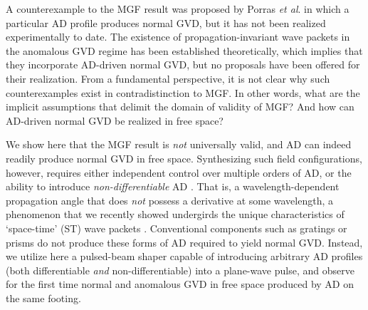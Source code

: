 \documentclass[reprint,
 amsmath,amssymb,
 aps,
]{revtex4-2}
\begin{document}
A counterexample to the MGF result was proposed by Porras \textit{et al}. \cite{Porras03PRE2} in which a particular AD profile produces normal GVD, but it has not been realized experimentally to date. The existence of propagation-invariant wave packets in the anomalous GVD regime \cite{Zamboni03OC,Longhi03PRE,Longhi04OL,Porras04PRE,Malaguti08OL} has been established theoretically, which implies that they incorporate AD-driven normal GVD, but no proposals have been offered for their realization. From a fundamental perspective, it is not clear why such counterexamples exist in contradistinction to MGF. In other words, what are the implicit assumptions that delimit the domain of validity of MGF? And how can AD-driven normal GVD be realized in free space?

We show here that the MGF result is \textit{not} universally valid, and AD can indeed readily produce normal GVD in free space. Synthesizing such field configurations, however, requires either independent control over multiple orders of AD, or the ability to introduce \textit{non-differentiable} AD \cite{Hall21OL,Yessenov21ACSP}. That is, a wavelength-dependent propagation angle that does \textit{not} possess a derivative at some wavelength, a phenomenon that we recently showed undergirds the unique characteristics of `space-time' (ST) wave packets \cite{Kondakci16OE,Parker16OE,Kondakci17NP,Porras17OL,Wong17ACSP2,Efremidis17OL,Yessenov19OPN,Yessenov19OE,Yessenov19PRA}. Conventional components such as gratings or prisms do not produce these forms of AD required to yield normal GVD. Instead, we utilize here a pulsed-beam shaper capable of introducing arbitrary AD profiles (both differentiable \textit{and} non-differentiable) into a plane-wave pulse, and observe for the first time normal and anomalous GVD in free space produced by AD on the same footing.
\end{document}
